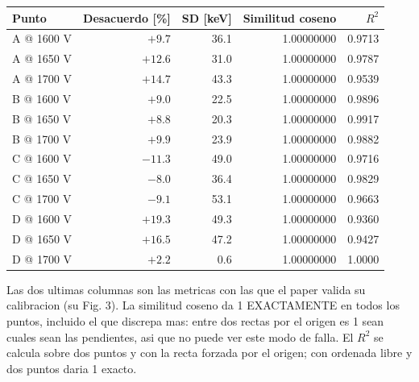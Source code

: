 \begin{tabular}{lrrrr}
\toprule
\textbf{Punto} & \textbf{Desacuerdo [\%]} & \textbf{SD [keV]} & \textbf{Similitud coseno} & \textbf{$R^2$} \\
\midrule
A @ 1600 V & $+9.7$ & 36.1 & 1.00000000 & 0.9713 \\
A @ 1650 V & $+12.6$ & 31.0 & 1.00000000 & 0.9787 \\
A @ 1700 V & $+14.7$ & 43.3 & 1.00000000 & 0.9539 \\
B @ 1600 V & $+9.0$ & 22.5 & 1.00000000 & 0.9896 \\
B @ 1650 V & $+8.8$ & 20.3 & 1.00000000 & 0.9917 \\
B @ 1700 V & $+9.9$ & 23.9 & 1.00000000 & 0.9882 \\
C @ 1600 V & $-11.3$ & 49.0 & 1.00000000 & 0.9716 \\
C @ 1650 V & $-8.0$ & 36.4 & 1.00000000 & 0.9829 \\
C @ 1700 V & $-9.1$ & 53.1 & 1.00000000 & 0.9663 \\
D @ 1600 V & $+19.3$ & 49.3 & 1.00000000 & 0.9360 \\
D @ 1650 V & $+16.5$ & 47.2 & 1.00000000 & 0.9427 \\
D @ 1700 V & $+2.2$ & 0.6 & 1.00000000 & 1.0000 \\
\bottomrule
\end{tabular}
\par\smallskip
\begin{minipage}{0.95\linewidth}\footnotesize Las dos ultimas columnas son las metricas con las que el paper valida su calibracion (su Fig. 3). La similitud coseno da 1 EXACTAMENTE en todos los puntos, incluido el que discrepa mas: entre dos rectas por el origen es 1 sean cuales sean las pendientes, asi que no puede ver este modo de falla. El $R^2$ se calcula sobre dos puntos y con la recta forzada por el origen; con ordenada libre y dos puntos daria 1 exacto.\end{minipage}
